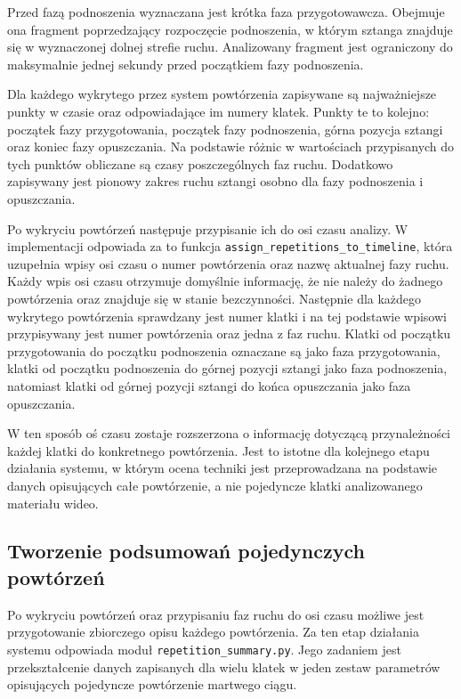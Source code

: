 Przed fazą podnoszenia wyznaczana jest krótka faza przygotowawcza. Obejmuje ona fragment poprzedzający rozpoczęcie podnoszenia, w którym sztanga znajduje się w wyznaczonej dolnej strefie ruchu. Analizowany fragment jest ograniczony do maksymalnie jednej sekundy przed początkiem fazy podnoszenia.

Dla każdego wykrytego przez system powtórzenia zapisywane są najważniejsze punkty w czasie oraz odpowiadające im numery klatek. Punkty te to kolejno: początek fazy przygotowania, początek fazy podnoszenia, górna pozycja sztangi oraz koniec fazy opuszczania. Na podstawie różnic w wartościach przypisanych do tych punktów obliczane są czasy poszczególnych faz ruchu. Dodatkowo zapisywany jest pionowy zakres ruchu sztangi osobno dla fazy podnoszenia i opuszczania.

Po wykryciu powtórzeń następuje przypisanie ich do osi czasu analizy. W implementacji odpowiada za to funkcja \texttt{assign\_repetitions\_to\_timeline}, która uzupełnia wpisy osi czasu o numer powtórzenia oraz nazwę aktualnej fazy ruchu. Każdy wpis osi czasu otrzymuje domyślnie informację, że nie należy do żadnego powtórzenia oraz znajduje się w stanie bezczynności. Następnie dla każdego wykrytego powtórzenia sprawdzany jest numer klatki i na tej podstawie wpisowi przypisywany jest numer powtórzenia oraz jedna z faz ruchu. Klatki od początku przygotowania do początku podnoszenia oznaczane są jako faza przygotowania, klatki od początku podnoszenia do górnej pozycji sztangi jako faza podnoszenia, natomiast klatki od górnej pozycji sztangi do końca opuszczania jako faza opuszczania.

W ten sposób oś czasu zostaje rozszerzona o informację dotyczącą przynależności każdej klatki do konkretnego powtórzenia. Jest to istotne dla kolejnego etapu działania systemu, w którym ocena techniki jest przeprowadzana na podstawie danych opisujących całe powtórzenie, a nie pojedyncze klatki analizowanego materiału wideo.

\subsection{Tworzenie podsumowań pojedynczych powtórzeń}

Po wykryciu powtórzeń oraz przypisaniu faz ruchu do osi czasu możliwe jest przygotowanie zbiorczego opisu każdego powtórzenia. Za ten etap działania systemu odpowiada moduł \texttt{repetition\_summary.py}. Jego zadaniem jest przekształcenie danych zapisanych dla wielu klatek w jeden zestaw parametrów opisujących pojedyncze powtórzenie martwego ciągu.

